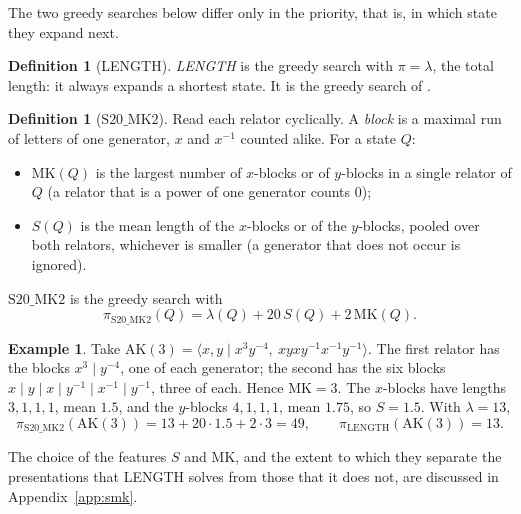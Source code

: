 \documentclass[11pt]{article}
\theoremstyle{definition}
\newtheorem{definition}[theorem]{Definition}
\newtheorem{example}[theorem]{Example}
\theoremstyle{remark}
\newcommand{\pres}[2]{\langle #1 \mid #2 \rangle}
\newcommand{\SMK}{\mathrm{S20\_MK2}}
\begin{document}
The two greedy searches below differ only in the priority, that is, in which state they expand next.

\begin{definition}[LENGTH]\label{def:length}
\emph{LENGTH} is the greedy search with $\pi=\lambda$, the total length: it always expands a shortest state. It is the
greedy search of \cite{SMM24}.
\end{definition}

\begin{definition}[$\SMK$]\label{def:smk}
Read each relator cyclically. A \emph{block} is a maximal run of letters of one generator, $x$ and $x^{-1}$ counted
alike. For a state $Q$:
\begin{itemize}
  \item $\mathrm{MK}(Q)$ is the largest number of $x$-blocks or of $y$-blocks in a single relator of $Q$ (a relator
  that is a power of one generator counts $0$);
  \item $S(Q)$ is the mean length of the $x$-blocks or of the $y$-blocks, pooled over both relators, whichever is
  smaller (a generator that does not occur is ignored).
\end{itemize}
$\SMK$ is the greedy search with
\[
\pi_{\SMK}(Q)=\lambda(Q)+20\,S(Q)+2\,\mathrm{MK}(Q).
\]
\end{definition}

\begin{example}
Take $\mathrm{AK}(3)=\pres{x,y}{x^3y^{-4},\ xyxy^{-1}x^{-1}y^{-1}}$. The first relator has the blocks
$x^3\mid y^{-4}$, one of each generator; the second has the six blocks $x\mid y\mid x\mid y^{-1}\mid x^{-1}\mid y^{-1}$,
three of each. Hence $\mathrm{MK}=3$. The $x$-blocks have lengths $3,1,1,1$, mean $1.5$, and the $y$-blocks
$4,1,1,1$, mean $1.75$, so $S=1.5$. With $\lambda=13$,
\[
\pi_{\SMK}(\mathrm{AK}(3))=13+20\cdot1.5+2\cdot3=49,\qquad \pi_{\mathrm{LENGTH}}(\mathrm{AK}(3))=13.
\]
\end{example}

The choice of the features $S$ and $\mathrm{MK}$, and the extent to which they separate the presentations that LENGTH solves from those that it does not, are discussed in Appendix~\ref{app:smk}.
\end{document}
